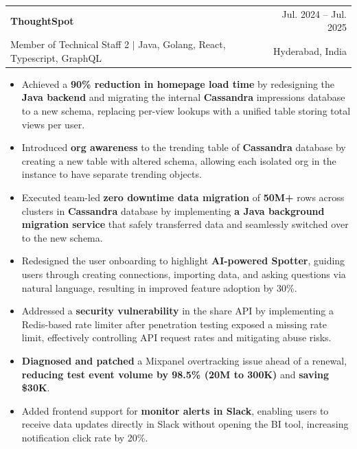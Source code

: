 \documentclass[letterpaper,11pt]{article}
\makeatletter
\newcommand{\resumeItem}[1]{%
  \item\small{#1}%
}
\newcommand{\resumeSubheading}[4]{
  \vspace{-2pt}\item
    \begin{tabular*}{0.97\textwidth}[t]{l@{\extracolsep{\fill}}r}
      \textbf{#1} & #2 \\
      {\small#3} & {\small #4} \\
    \end{tabular*}\vspace{-7pt}
}
\newcommand{\resumeItemListStart}{%
  \begin{itemize}[itemsep=0pt, parsep=0pt, topsep=0pt, partopsep=0pt]
}
\newcommand{\resumeItemListEnd}{\end{itemize}\vspace{-5pt}}
\makeatother
\begin{document}
    \resumeSubheading
      {ThoughtSpot}{Jul. 2024 -- Jul. 2025}
      {Member of Technical Staff 2 $|$ {Java, Golang, React, Typescript, GraphQL}}{Hyderabad, India}
      \resumeItemListStart
        \resumeItem{Achieved a \textbf{90\% reduction in homepage load time} by redesigning the \textbf{Java backend} and migrating the internal \textbf{Cassandra} impressions database to a new schema, replacing per-view lookups with a unified table storing total views per user.}
        \resumeItem{Introduced \textbf{org awareness} to the trending table of \textbf{Cassandra} database by creating a new table with altered schema, allowing each isolated org in the instance to have separate trending objects.}
        \resumeItem{Executed team-led \textbf{zero downtime data migration} of \textbf{50M+} rows across clusters in \textbf{Cassandra} database by implementing \textbf{a Java background migration service} that safely transferred data and seamlessly switched over to the new schema.}
        \resumeItem{Redesigned the user onboarding to highlight \textbf{AI-powered Spotter}, guiding users through creating connections, importing data, and asking questions via natural language, resulting in improved feature adoption by 30\%.}
        \resumeItem{Addressed a \textbf{security vulnerability} in the share API by implementing a Redis-based rate limiter after penetration testing exposed a missing rate limit, effectively controlling API request rates and mitigating abuse risks.}
        \resumeItem{\textbf{Diagnosed and patched} a Mixpanel overtracking issue ahead of a renewal, \textbf{reducing test event volume by 98.5\% (20M to 300K)} and \textbf{saving \$30K}. %
        }
        \resumeItem{Added frontend support for \textbf{monitor alerts in Slack}, enabling users to receive data updates directly in Slack without opening the BI tool, increasing notification click rate by 20\%.}
      \resumeItemListEnd
\end{document}
